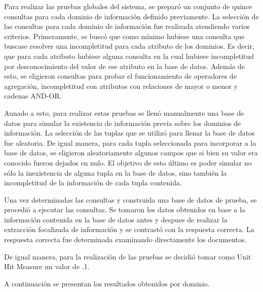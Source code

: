 Para realizar las pruebas globales del sistema, se preparó un conjunto de quince consultas para cada dominio de información definido previamente. La selección de las consultas para cada dominio de información fue realizada atendiendo varios criterios. Primeramente, se buscó que como mínimo hubiese una consulta que buscase resolver una incompletitud para cada atributo de los dominios. Es decir, que para cada atributo hubiese alguna consulta en la cual hubiese incompletitud por desconocimiento del valor de ese atributo en la base de datos. Además de esto, se eligieron consultas para probar el funcionamiento de operadores de agregación, incompletitud con atributos con relaciones de mayor o menor y cadenas AND-OR.

Aunado a esto, para realizar estas pruebas se llenó manualmente una base de datos para simular la existencia de información previa sobre los dominios de información. La selección de las tuplas que se utilizó para llenar la base de datos fue aleatoria. De igual manera, para cada tupla seleccionada para incorporar a la base de datos, se eligieron aleatoriamente algunos campos que si bien su valor era conocido fueron dejados en nulo. El objetivo de esto último es poder simular no sólo la inexistencia de alguna tupla en la base de datos, sino también la incompletitud de la información de cada tupla contenida. 

Una vez determinadas las consultas y construida una base de datos de prueba, se procedió a ejecutar las consultas. Se tomaron los datos obtenidos en base a la información contenida en la base de datos antes y despues de realizar la extracción focalizada de información y se contrastó con la respuesta correcta. La respuesta correcta fue determinada  examinando directamente los documentos.

De igual manera, para la realización de las pruebas se decidió tomar como Unit Hit Measure un valor de .1. 

A continuación se presentan los resultados obtenidos por dominio.


